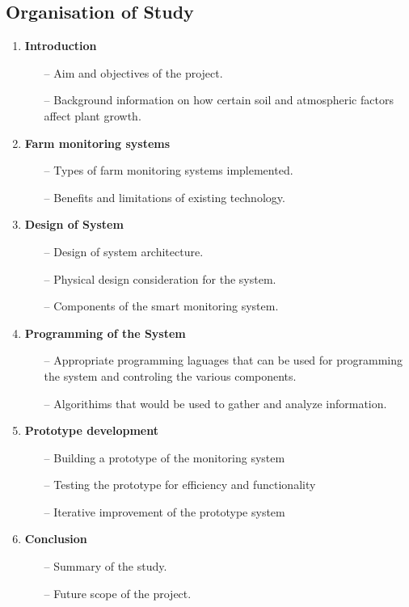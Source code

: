 \documentclass[12pt, a4paper]{article}
\begin{document}
\subsection{Organisation of Study}
\begin{enumerate}
\item \textbf{Introduction}
	\begin{itemize}
	\item[--] Aim and objectives of the project.
	\item[--] Background information on how certain soil and atmospheric factors affect plant    growth.
	\end{itemize}
\item \textbf{Farm monitoring systems}
\begin{itemize}
    \item[--] Types of farm monitoring systems implemented.
	\item[--] Benefits and limitations of existing technology.
\end{itemize}
\item \textbf{Design of System}
\begin{itemize}
	\item[--] Design of system architecture.
    \item[--] Physical design consideration for the system.
    \item[--] Components of the smart monitoring system.
\end{itemize}
\item \textbf{Programming of the System}
\begin{itemize}
	\item[--] Appropriate programming laguages that can be used for programming the system and controling the various components.
	\item[--] Algorithims that would be used to gather and analyze information.
\end{itemize}
\item \textbf{Prototype development}
\begin{itemize}
\item[--] Building a prototype of the monitoring system
\item[--] Testing the prototype for efficiency and functionality
\item[--] Iterative improvement of the prototype system
\end{itemize}
\item \textbf{Conclusion}
\begin{itemize}
	\item[--] Summary of the study.
	\item[--] Future scope of the project.
\end{itemize}
\end{enumerate}
\newpage
\end{document}
